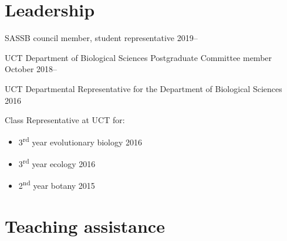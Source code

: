 \documentclass[10pt]{article}
\begin{document}
\section*{Leadership} %

SASSB council member, student representative              \hfill 2019--

UCT Department of Biological Sciences Postgraduate Committee member
                                                 \hfill October 2018--

UCT Departmental Representative for the Department of Biological Sciences
                                                            \hfill 2016

Class Representative at UCT for:

\begin{itemize}[noitemsep, nolistsep]
  \item 3\textsuperscript{rd} year evolutionary biology     \hfill 2016
  \item 3\textsuperscript{rd} year ecology                  \hfill 2016
  \item 2\textsuperscript{nd} year botany                   \hfill 2015
\end{itemize}

\section*{Teaching assistance} %

\end{document}
